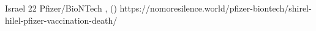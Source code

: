           {Israel}
          {22}
          {Pfizer/BioNTech}
          {}
          {
            ,
             ()
          }
          {https://nomoresilence.world/pfizer-biontech/shirel-hilel-pfizer-vaccination-death/}



